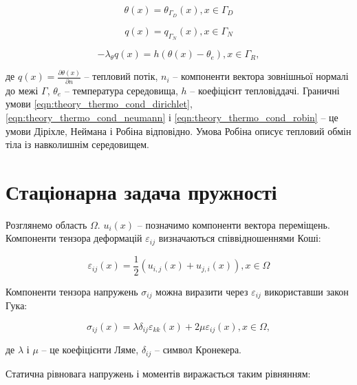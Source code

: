 \begin{equation}
    \label{eqn:theory_thermo_cond_dirichlet}
    \theta(x) = \theta_{\Gamma_D}(x), x \in \Gamma_D 
\end{equation}

\begin{equation}
    \label{eqn:theory_thermo_cond_neumann}
    q(x) = q_{\Gamma_N}(x), x \in \Gamma_N
\end{equation}

\begin{equation}
    \label{eqn:theory_thermo_cond_robin}
    -\lambda_\theta q(x) = h(\theta(x) - \theta_e), x \in \Gamma_R,
\end{equation}

\noindent де $q(x) = \frac{\partial \theta(x)}{\partial n}$ -- тепловий потік, $n_i$ -- компоненти вектора зовнішньої 
нормалі до межі $\Gamma$, $\theta_e$ -- температура середовища, $h$ -- коефіцієнт тепловіддачі. Граничні умови 
\ref{eqn:theory_thermo_cond_dirichlet}, \ref{eqn:theory_thermo_cond_neumann} і \ref{eqn:theory_thermo_cond_robin} -- це 
умови Діріхле, Неймана і Робіна відповідно. Умова Робіна описує тепловий обмін тіла із навколишнім середовищем.

\section{Стаціонарна задача пружності}

Розглянемо область $\Omega$. $u_i(x)$ -- позначимо компоненти вектора переміщень. Компоненти тензора деформацій 
$\varepsilon_{ij}$ визначаються співвідношеннями Коші:  

\begin{equation}
    \label{eqn:theory_elasticity_gauchy_tensor}
    \varepsilon_{ij}(x) = \frac{1}{2}(u_{i,j}(x) + u_{j,i}(x)), x \in \Omega
\end{equation}

Компоненти тензора напружень $\sigma_{ij}$ можна виразити через $\varepsilon_{ij}$ використавши закон Гука:

\begin{equation}
    \label{eqn:theory_elasticity_hooke_law}
    \sigma_{ij}(x) = \lambda \delta_{ij}\varepsilon_{kk}(x) + 2\mu\varepsilon_{ij}(x), x \in \Omega,
\end{equation}

\noindent де $\lambda$ і $\mu$ -- це коефіцієнти Ляме, $\delta_{ij}$ -- символ Кронекера. 

Статична рівновага напружень і моментів виражається таким рівнянням:

